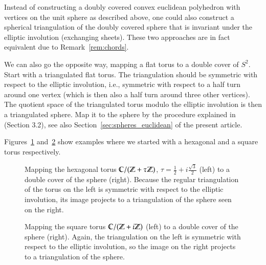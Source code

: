 \documentclass[Thesis]{subfiles}
\begin{document}
\begin{remark}
  Instead of constructing a doubly covered convex euclidean polyhedron
  with vertices on the unit sphere as described above, one could also
  construct a spherical triangulation of the doubly covered sphere
  that is invariant under the elliptic involution (exchanging
  sheets). These two approaches are in fact equivalent due to
  Remark~\ref{rem:chords}. 
\end{remark}

 We can
also go the opposite way, mapping a flat torus to a double cover of
$S^{2}$. Start with a triangulated flat torus. The triangulation
should be symmetric with respect to the elliptic involution, i.e.,
symmetric with respect to a half turn around one vertex (which is then
also a half turn around three other vertices). The quotient space of
the triangulated torus modulo the elliptic involution is then a
triangulated sphere. Map it to the sphere by the procedure explained
in~\cite{BPS2015:dconf} (Section 3.2), see also
Section~\ref{sec:spheres_euclidean} of the present article.

Figures~\ref{fig:wente_elliptic} and~\ref{fig:square_elliptic} show
examples where we started with a hexagonal and a square torus
respectively. 

\begin{figure}
\centering
{}
\caption{Mapping the hexagonal torus $\mathbb C/(\mathbb Z+\tau\mathbb Z)$,
  $\tau=\tfrac{1}{2}+i\tfrac{\sqrt 3}{2}$ (left) to a double cover of
  the sphere (right). Because the regular triangulation of the torus
  on the left is symmetric with respect to the elliptic involution,
  its image projects to a triangulation of the sphere seen on the right.} 
\label{fig:wente_elliptic}
\end{figure}

\begin{figure}
\centering
{}
\caption{ Mapping the square torus $\mathbb C/(\mathbb Z+i\mathbb Z)$ (left) to a double
  cover of the sphere (right). Again, the triangulation on the left
  is symmetric with respect to the elliptic involution, so the image
  on the right projects to a triangulation of the sphere.}
\label{fig:square_elliptic} 
\end{figure}
\end{document}
